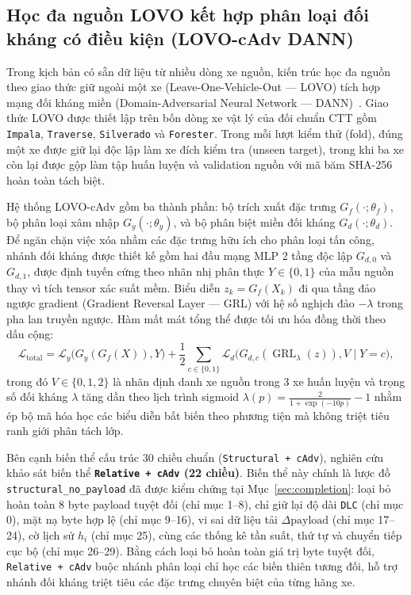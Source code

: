\documentclass[12pt, a4paper, reqno, oneside]{book}
\DeclareRobustCommand{\code}[1]{\nolinkurl{#1}}
\begin{document}
\subsection[Học đa nguồn LOVO kết hợp đối kháng có điều kiện]{Học đa nguồn LOVO kết hợp phân loại đối kháng có điều kiện (LOVO-cAdv DANN)}\label{subsec:method-lovo}
Trong kịch bản có sẵn dữ liệu từ nhiều dòng xe nguồn, kiến trúc học đa nguồn theo giao thức giữ ngoài một xe (Leave-One-Vehicle-Out --- LOVO) tích hợp mạng đối kháng miền (Domain-Adversarial Neural Network --- DANN)~\cite{ganin2016dann}. Giao thức LOVO được thiết lập trên bốn dòng xe vật lý của đối chuẩn CTT gồm \code{Impala}, \code{Traverse}, \code{Silverado} và \code{Forester}. Trong mỗi lượt kiểm thử (fold), đúng một xe được giữ lại độc lập làm xe đích kiểm tra (unseen target), trong khi ba xe còn lại được gộp làm tập huấn luyện và validation nguồn với mã băm SHA-256 hoàn toàn tách biệt.

Hệ thống LOVO-cAdv gồm ba thành phần: bộ trích xuất đặc trưng $G_f(\cdot; \theta_f)$, bộ phân loại xâm nhập $G_y(\cdot; \theta_y)$, và bộ phân biệt miền đối kháng $G_d(\cdot; \theta_d)$. Để ngăn chặn việc xóa nhầm các đặc trưng hữu ích cho phân loại tấn công, nhánh đối kháng được thiết kế gồm hai đầu mạng MLP 2 tầng độc lập $G_{d,0}$ và $G_{d,1}$, được định tuyến cứng theo nhãn nhị phân thực $Y \in \{0, 1\}$ của mẫu nguồn thay vì tích tensor xác suất mềm. Biểu diễn $z_k = G_f(X_k)$ đi qua tầng đảo ngược gradient (Gradient Reversal Layer --- GRL) với hệ số nghịch đảo $-\lambda$ trong pha lan truyền ngược. Hàm mất mát tổng thể được tối ưu hóa đồng thời theo dấu cộng:
\begin{equation}
\mathcal{L}_{\text{total}} = \mathcal{L}_y\big(G_y(G_f(X)), Y\big) + \frac{1}{2}\sum_{c\in\{0,1\}} \mathcal{L}_d\big(G_{d,c}(\operatorname{GRL}_{\lambda}(z)), V \mid Y=c\big),
\end{equation}
trong đó $V \in \{0, 1, 2\}$ là nhãn định danh xe nguồn trong 3 xe huấn luyện và trọng số đối kháng $\lambda$ tăng dần theo lịch trình sigmoid $\lambda(p) = \frac{2}{1 + \exp(-10p)} - 1$ nhằm ép bộ mã hóa học các biểu diễn bất biến theo phương tiện mà không triệt tiêu ranh giới phân tách lớp.

Bên cạnh biến thể cấu trúc 30 chiều chuẩn (\code{Structural + cAdv}), nghiên cứu khảo sát biến thể \textbf{\code{Relative + cAdv} (22 chiều)}. Biến thể này chính là lược đồ \code{structural_no_payload} đã được kiểm chứng tại Mục~\ref{sec:completion}: loại bỏ hoàn toàn 8 byte payload tuyệt đối (chỉ mục 1--8), chỉ giữ lại độ dài \code{DLC} (chỉ mục 0), mặt nạ byte hợp lệ (chỉ mục 9--16), vi sai dữ liệu tải $\Delta\text{payload}$ (chỉ mục 17--24), cờ lịch sử $h_i$ (chỉ mục 25), cùng các thống kê tần suất, thứ tự và chuyển tiếp cục bộ (chỉ mục 26--29). Bằng cách loại bỏ hoàn toàn giá trị byte tuyệt đối, \code{Relative + cAdv} buộc nhánh phân loại chỉ học các biến thiên tương đối, hỗ trợ nhánh đối kháng triệt tiêu các đặc trưng chuyên biệt của từng hãng xe.
\end{document}
